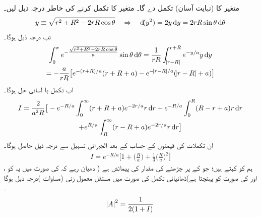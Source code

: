  متغیر    کا (نہایت آسان) تکمل     دے گا۔ متغیر      کا تکمل  کرنے کی خاطر درجہ ذیل لیں۔
\begin{align*}
y\equiv\sqrt{r^{2}+R^{2}-2rR\cos{\theta}}\quad  \Rightarrow \quad \dif (y^{2})=2y\dif y=2rR\sin{\theta}\dif \theta
\end{align*}
  تب درجہ ذیل ہوگا۔
\begin{multline*}
\int_{0}^{\pi}e^{-\tfrac{\sqrt{r^{2}+R^{2}-2rR\cos{\theta}}}{a}}\sin{\theta}\dif \theta=\frac{1}{rR}\int_{\abs{r-R}}^{r+R}e^{-y/a}y\dif y\\
=-\frac{a}{rR}\big[e^{-(r+R)/a}(r+R+a)-e^{-\abs{r-R}/a}(\abs{r-R}+a)\big]
\end{multline*}
 اب تکمل   با آسانی حل ہوگا۔ 
\begin{multline*}
I=\frac{2}{a^{2}R}\big[-e^{-R/a}\int_{0}^{\infty}(r+R+a)e^{-2r/a}r\dif r+e^{-R/a}\int_{0}^{R}(R-r+a)r\dif r\\
+e^{R/a}\int_{R}^{\infty}(r-R+a)e^{-2r/a}r\dif r\big]
\end{multline*}
 ان تکملات کی قیمتوں کے حساب   کے بعد   الجبرائی   تسہیل  سے  درجہ ذیل حاصل ہوگا۔
\begin{align}
I=e^{-R/a}\big[1+\big(\frac{R}{a}\big)+\frac{1}{3}\big(\frac{R}{a}\big)^{2}\big]
\end{align}
ہم    کو      کہتے ہیں؛  جو   کے      پر چڑھنے کی مقدار کی پیمائش ہے ( دھیان رہے کہ     کی صورت میں یہ  کو ،  اور       کی صورت   کو پہنچتا ہے)ڈھانپائی تکمل  کی صورت    میں مستقل   معمول زنی   (مساوات  )درجہ ذیل ہوگا ۔
\begin{align}
\abs{A}^{2}=\frac{1}{2(1+I)} 
\end{align}

